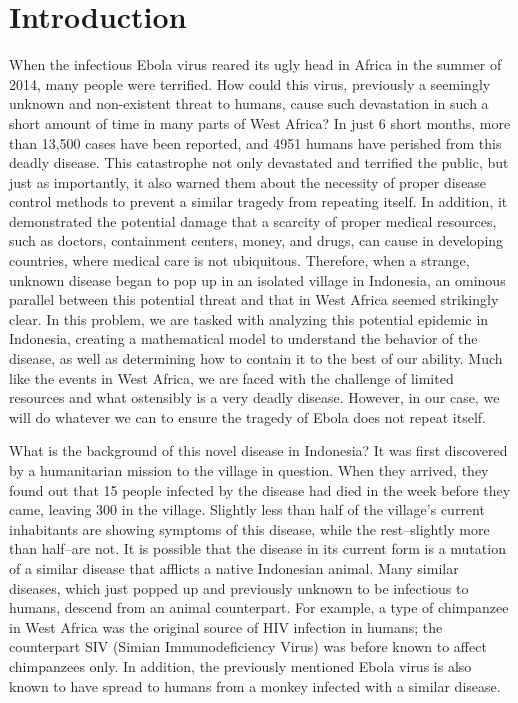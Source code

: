 \documentclass[11pt]{article}
\begin{document}
\section{Introduction}
When the infectious Ebola virus reared its ugly head in Africa in the summer of 2014, many people were terrified. How could this virus, previously a seemingly unknown and non-existent threat to humans, cause such devastation in such a short amount of time in many parts of West Africa? In just 6 short months, more than 13,500 cases have been reported, and 4951 humans have perished from this deadly disease. This catastrophe not only devastated and terrified the public, but just as importantly, it also warned them about the necessity of proper disease control methods to prevent a similar tragedy from repeating itself. In addition, it demonstrated the potential damage that a scarcity of proper medical resources, such as doctors, containment centers, money, and drugs, can cause in developing countries, where medical care is not ubiquitous. Therefore, when a strange, unknown disease began to pop up in an isolated village in Indonesia, an ominous parallel between this potential threat and that in West Africa seemed strikingly clear. In this problem, we are tasked with analyzing this potential epidemic in Indonesia, creating a mathematical model to understand the behavior of the disease, as well as determining how to contain it to the best of our ability. Much like the events in West Africa, we are faced with the challenge of limited resources and what ostensibly is a very deadly disease. However, in our case, we will do whatever we can to ensure the tragedy of Ebola does not repeat itself.

What is the background of this novel disease in Indonesia? It was first discovered by a humanitarian mission to the village in question. When they arrived, they found out that 15 people infected by the disease had died in the week before they came, leaving 300 in the village. Slightly less than half of the village’s current inhabitants are showing symptoms of this disease, while the rest--slightly more than half--are not. It is possible that the disease in its current form is a mutation of a similar disease that afflicts a native Indonesian animal. Many similar diseases, which just popped up and previously unknown to be infectious to humans, descend from an animal counterpart. For example, a type of chimpanzee in West Africa was the original source of HIV infection in humans; the counterpart SIV (Simian Immunodeficiency Virus) was before known to affect chimpanzees only. In addition, the previously mentioned Ebola virus is also known to have spread to humans from a monkey infected with a similar disease.
\end{document}
